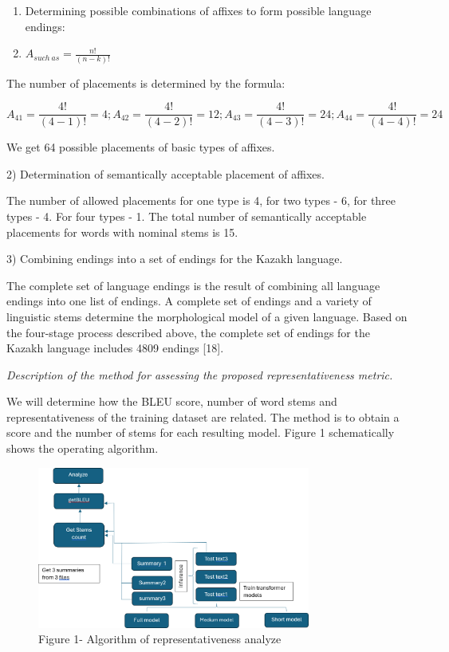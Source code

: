 \begin{multicols}{2}
\begin{enumerate}
\def\labelenumi{\arabic{enumi})}
\item
  Determining possible combinations of affixes to form possible language
  endings:
\item
  \(A_{such\ as} = \frac{n!}{(n - k)!}\)
\end{enumerate}

The number of placements is determined by the formula:
\end{multicols}

\[A_{41} = \frac{4!}{(4 - 1)!} = 4;A_{42} = \frac{4!}{(4 - 2)!} = 12;A_{43} = \frac{4!}{(4 - 3)!} = 24;A_{44} = \frac{4!}{(4 - 4)!} = 24\]

\begin{multicols}{2}
We get 64 possible placements of basic types of affixes.

2) Determination of semantically acceptable placement of affixes.

The number of allowed placements for one type is 4, for two types - 6,
for three types - 4. For four types - 1. The total number of
semantically acceptable placements for words with nominal stems is 15.

3) Combining endings into a set of endings for the Kazakh language.

The complete set of language endings is the result of combining all
language endings into one list of endings. A complete set of endings and
a variety of linguistic stems determine the morphological model of a
given language. Based on the four-stage process described above, the
complete set of endings for the Kazakh language includes 4809 endings
{[}18{]}.

\emph{Description of the method for assessing the proposed
representativeness metric.}

We will determine how the BLEU score, number of word stems and
representativeness of the training dataset are related. The method is to
obtain a score and the number of stems for each resulting model. Figure
1 schematically shows the operating algorithm.
\end{multicols}

\begin{figure}[H]
	\centering
	\includegraphics[width=0.8\textwidth]{assets/55}
	\caption*{Figure 1- Algorithm of representativeness analyze}
\end{figure}

